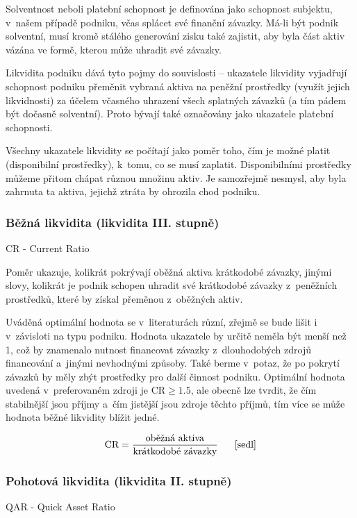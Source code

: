 Solventnost neboli platební schopnost je definována jako schopnost subjektu, v~našem případě podniku, včas splácet své finanční závazky. Má-li být podnik solventní, musí kromě stálého generování zisku také zajistit, aby byla část aktiv vázána ve formě, kterou může uhradit své závazky.

Likvidita podniku dává tyto pojmy do souvislosti -- ukazatele likvidity vyjadřují schopnost podniku přeměnit vybraná aktiva na peněžní prostředky (využít jejich likvidnosti) za účelem včasného uhrazení všech splatných závazků (a tím pádem být dočasně solventní).\cite{schol} Proto bývají také označovány jako ukazatele platební schopnosti.

Všechny ukazatele likvidity se počítají jako poměr toho, čím je možné platit (disponibilní prostředky), k~tomu, co se musí zaplatit. Disponibilními prostředky můžeme přitom chápat různou množinu aktiv. Je samozřejmě nesmysl, aby byla zahrnuta ta aktiva, jejichž ztráta by ohrozila chod podniku.

\subsubsection{Běžná likvidita (likvidita III. stupně)} 
CR - Current Ratio

Poměr ukazuje, kolikrát pokrývají oběžná aktiva krátkodobé závazky, jinými slovy, kolikrát je podnik schopen uhradit své krátkodobé závazky z~peněžních prostředků, které by získal přeměnou z~oběžných aktiv.

Uváděná optimální hodnota se v~literaturách různí, zřejmě se bude lišit i v~závisloti na typu podniku. Hodnota ukazatele by určitě neměla být menší než 1, což by znamenalo nutnost financovat závazky z~dlouhodobých zdrojů financování a~jinými nevhodnými způsoby. Také berme v~potaz, že po pokrytí závazků by měly zbýt prostředky pro další činnost podniku.
Optimální hodnota uvedená v~preferovaném zdroji je CR$\geq 1.5$, ale obecně lze tvrdit, že čím stabilnější jsou příjmy a~čím jistější jsou zdroje těchto příjmů, tím více se může hodnota běžné likvidity blížit jedné.\cite{businessvize_bez_likv}

$$\vz{CR}{oběžná aktiva}{krátkodobé závazky} \scite{sedl}$$

\subsubsection{Pohotová likvidita (likvidita II. stupně)} 
QAR - Quick Asset Ratio

